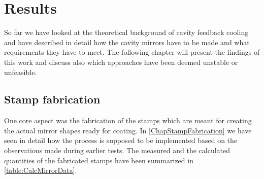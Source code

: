 \chapter{Results}
So far we have looked at the theoretical background of cavity feedback cooling and have described in detail how the cavity mirrors have to be made and what requirements they have to meet. The following chapter will present the findings of this work and discuss also which approaches have been deemed unstable or unfeasible.

\section{Stamp fabrication}
One core aspect was the fabrication of the stamps which are meant for creating the actual mirror shapes ready for coating. In \autoref{ChapStampFabrication} we have seen in detail how the process is supposed to be implemented based on the observations made during earlier tests. The measured and the calculated quantities of the fabricated stamps have been summarized in \autoref{table:CalcMirrorData}.
